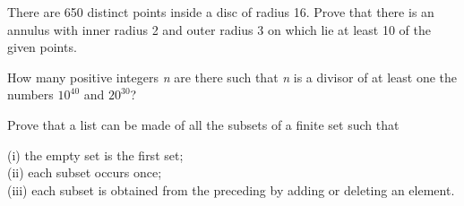 \documentclass{article}
\begin{document}
There are 650 distinct points inside a disc of radius 16. Prove that there is an annulus with inner radius 2 and outer radius 3 on which lie at least
10 of the given points.

 How many positive integers \textit{ n} are there such that \textit{ n} is a divisor of at least one the numbers \(10^{40}\) and \(20^{30 }\)?

Prove that a list can be made of all the subsets of a finite set such that

 (i) the empty set is the first set;\\
(ii) each subset occurs once;\\
(iii) each subset is obtained from the preceding by adding or deleting an element.
\end{document}
